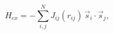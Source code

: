 \documentclass[preview]{standalone}
\begin{document}
\begin{varwidth}{50in}
  \begin{equation}
    H_{ex} = 
    -\sum_{i,j}^N J_{ij} (r_{ij}) \,\vec{s}_i \cdot \vec{s}_j 
  , \nonumber
  \end{equation}
\end{varwidth}
\end{document}

